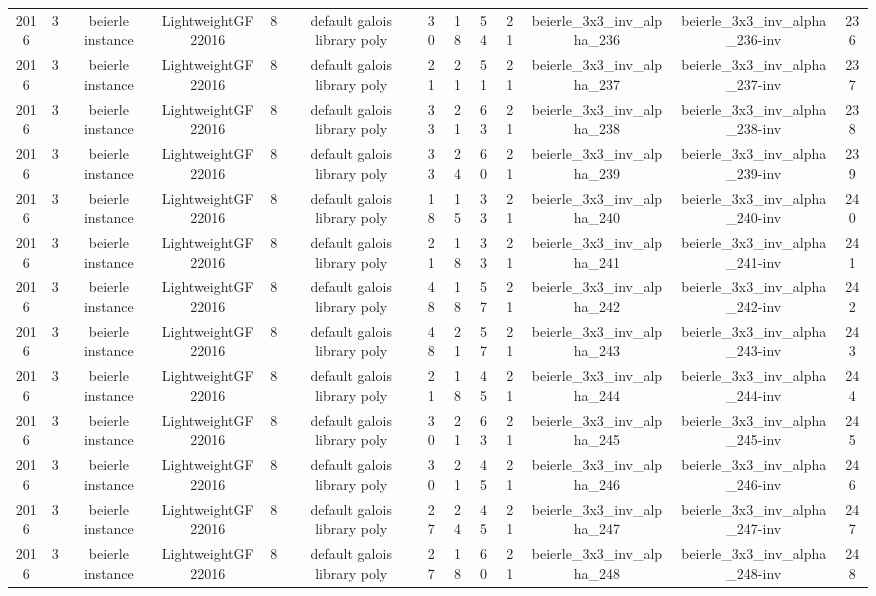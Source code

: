 \begin{tabular}{c c c c c c c c c c c c c}
2016 & 3 & beierle instance & LightweightGF22016 & 8 & default galois library poly & 30 & 18 & 54 & 21 & beierle_3x3_inv_alpha_236 & beierle_3x3_inv_alpha_236-inv & 236 \\
2016 & 3 & beierle instance & LightweightGF22016 & 8 & default galois library poly & 21 & 21 & 51 & 21 & beierle_3x3_inv_alpha_237 & beierle_3x3_inv_alpha_237-inv & 237 \\
2016 & 3 & beierle instance & LightweightGF22016 & 8 & default galois library poly & 33 & 21 & 63 & 21 & beierle_3x3_inv_alpha_238 & beierle_3x3_inv_alpha_238-inv & 238 \\
2016 & 3 & beierle instance & LightweightGF22016 & 8 & default galois library poly & 33 & 24 & 60 & 21 & beierle_3x3_inv_alpha_239 & beierle_3x3_inv_alpha_239-inv & 239 \\
2016 & 3 & beierle instance & LightweightGF22016 & 8 & default galois library poly & 18 & 15 & 33 & 21 & beierle_3x3_inv_alpha_240 & beierle_3x3_inv_alpha_240-inv & 240 \\
2016 & 3 & beierle instance & LightweightGF22016 & 8 & default galois library poly & 21 & 18 & 33 & 21 & beierle_3x3_inv_alpha_241 & beierle_3x3_inv_alpha_241-inv & 241 \\
2016 & 3 & beierle instance & LightweightGF22016 & 8 & default galois library poly & 48 & 18 & 57 & 21 & beierle_3x3_inv_alpha_242 & beierle_3x3_inv_alpha_242-inv & 242 \\
2016 & 3 & beierle instance & LightweightGF22016 & 8 & default galois library poly & 48 & 21 & 57 & 21 & beierle_3x3_inv_alpha_243 & beierle_3x3_inv_alpha_243-inv & 243 \\
2016 & 3 & beierle instance & LightweightGF22016 & 8 & default galois library poly & 21 & 18 & 45 & 21 & beierle_3x3_inv_alpha_244 & beierle_3x3_inv_alpha_244-inv & 244 \\
2016 & 3 & beierle instance & LightweightGF22016 & 8 & default galois library poly & 30 & 21 & 63 & 21 & beierle_3x3_inv_alpha_245 & beierle_3x3_inv_alpha_245-inv & 245 \\
2016 & 3 & beierle instance & LightweightGF22016 & 8 & default galois library poly & 30 & 21 & 45 & 21 & beierle_3x3_inv_alpha_246 & beierle_3x3_inv_alpha_246-inv & 246 \\
2016 & 3 & beierle instance & LightweightGF22016 & 8 & default galois library poly & 27 & 24 & 45 & 21 & beierle_3x3_inv_alpha_247 & beierle_3x3_inv_alpha_247-inv & 247 \\
2016 & 3 & beierle instance & LightweightGF22016 & 8 & default galois library poly & 27 & 18 & 60 & 21 & beierle_3x3_inv_alpha_248 & beierle_3x3_inv_alpha_248-inv & 248 \\

\end{tabular}
